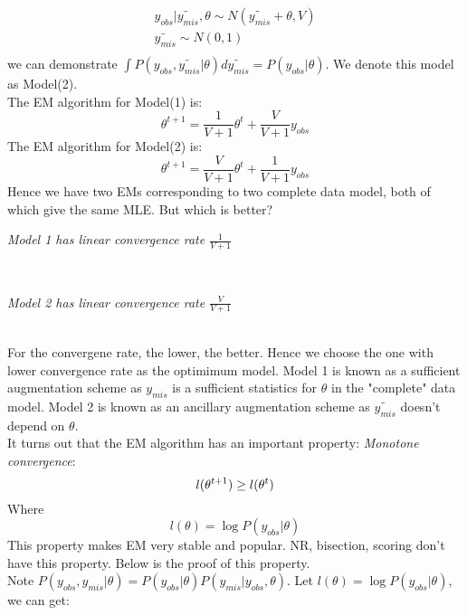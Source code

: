 \documentclass[a4paper]{article}
\begin{document}
\begin{eqnarray}
y_{obs}\vert \tilde{y_{mis}}, \theta \sim  N(\tilde{y_{mis}}+ \theta, V) \\
\tilde{y_{mis}} \sim N(0,1)\\
\end{eqnarray}
we can demonstrate $\int P(y_{obs}, \tilde{y_{mis}}\vert \theta)d\tilde{y_{mis}} = P(y_{obs}\vert \theta)$. We denote this model as Model(2).\\
The EM algorithm for Model(1) is:\\
\begin{equation}
\theta^{t+1} = \frac{1}{V+1}\theta^{t} + \frac{V}{V+1} y_{obs}
\end{equation}
The EM algorithm for Model(2) is:\\
\begin{equation}
\theta^{t+1} = \frac{V}{V+1}\theta^{t} + \frac{1}{V+1} y_{obs}
\end{equation}
Hence we have two EMs corresponding to two complete data model, both of which give the same MLE. But which is better?\\
\centerline{\it {Model 1 has linear convergence rate $\frac{1}{V+1}$}} \\
\centerline{\it {Model 2 has linear convergence rate $\frac{V}{V+1}$}}\\
For the convergene rate, the lower, the better. Hence we choose the one with lower convergence rate as the optimimum model. Model 1 is known as a sufficient augmentation scheme  as $y_{mis}$ is a sufficient statistics for $\theta$ in the "complete" data model. Model 2 is known as an ancillary augmentation scheme as $\tilde{y_{mis}}$ doesn't depend on $\theta$.\\
It turns out that the EM algorithm has an important property: \emph {Monotone convergence}:
\begin{equation}
l(\theta ^{t+1}) \ge  l(\theta ^{t}) \\
\end{equation} 
Where\\
\begin{equation}
l(\theta) = \log {P(y_{obs}\vert \theta)} \nonumber
\end{equation} 
This property makes EM very stable and popular. NR, bisection, scoring don't have this property. Below is the proof of this property.\\
Note $P(y_{obs}, y_{mis} \vert \theta) = P(y_{obs} \vert \theta)P(y_{mis} \vert y_{obs}, \theta)$.
Let $l(\theta) = \log{P(y_{obs}\vert \theta)} $, we can get:\\
\end{document}
